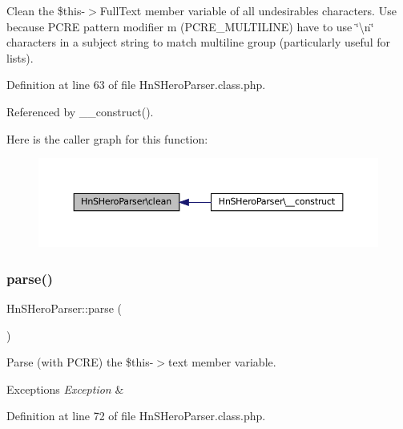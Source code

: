 Clean the \$this-\/$>$Full\+Text member variable of all undesirables characters. Use because P\+C\+RE pattern modifier m (P\+C\+R\+E\+\_\+\+M\+U\+L\+T\+I\+L\+I\+NE) have to use \char`\"{}\textbackslash{}n\char`\"{} characters in a subject string to match multiline group (particularly useful for lists). 



Definition at line 63 of file Hn\+S\+Hero\+Parser.\+class.\+php.



Referenced by \+\_\+\+\_\+construct().

Here is the caller graph for this function\+:\nopagebreak
\begin{figure}[H]
\begin{center}
\leavevmode
\includegraphics[width=350pt]{class_hn_s_hero_parser_aac2dc1befb5a88823cb1fdacaa170448_icgraph}
\end{center}
\end{figure}
\mbox{\label{class_hn_s_hero_parser_afe4a29be403c12f8b5e2e7e0c962953a}} 
\subsubsection{\texorpdfstring{parse()}{parse()}}
{\footnotesize\ttfamily Hn\+S\+Hero\+Parser\+::parse (\begin{DoxyParamCaption}{ }\end{DoxyParamCaption})}



Parse (with P\+C\+RE) the \$this-\/$>$text member variable. 


\begin{DoxyExceptions}{Exceptions}
{\em Exception} & \\
\hline
\end{DoxyExceptions}


Definition at line 72 of file Hn\+S\+Hero\+Parser.\+class.\+php.



